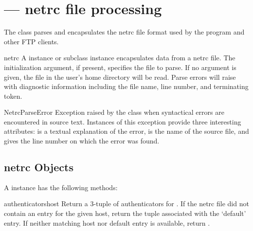 \section{ ---
         netrc file processing}




The  class parses and encapsulates the netrc file format
used by the \UNIX{}  program and other FTP clients.

\begin{classdesc}{netrc}{}
A  instance or subclass instance encapsulates data from 
a netrc file.  The initialization argument, if present, specifies the
file to parse.  If no argument is given, the file  in the
user's home directory will be read.  Parse errors will raise
 with diagnostic information including the
file name, line number, and terminating token.
\end{classdesc}

\begin{excdesc}{NetrcParseError}
Exception raised by the  class when syntactical errors
are encountered in source text.  Instances of this exception provide
three interesting attributes:   is a textual explanation
of the error,  is the name of the source file, and
 gives the line number on which the error was found.
\end{excdesc}


\subsection{netrc Objects \label{netrc-objects}}

A  instance has the following methods:

\begin{methoddesc}{authenticators}{host}
Return a 3-tuple 
of authenticators for .  If the netrc file did not
contain an entry for the given host, return the tuple associated with
the `default' entry.  If neither matching host nor default entry is
available, return .
\end{methoddesc}

